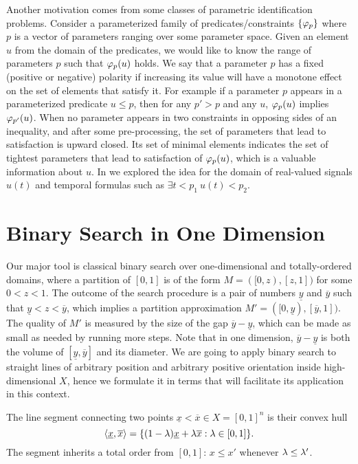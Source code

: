 \documentclass{llncs}%
\newcommand{\ul}[1]{{\underline{#1}}}
\renewcommand{\ov}[1]{{\overline{#1}}}
\newcommand{\ux}{\ul{x}}
\newcommand{\ox}{\ov{x}}
\newcommand{\uy}{\ul{y}}
\newcommand{\oy}{\ov{y}}
\newcommand{\diag}[2]{{\langle #1,#2\rangle}}
\begin{document}
Another motivation comes from some classes of parametric identification problems. Consider a parameterized family of predicates/constraints $\{\varphi_p\}$ where $p$ is a vector of parameters ranging over some parameter space. Given an element $u$  from the domain of the predicates, we would like to know the range of parameters $p$ such that $\varphi_p(u)$ holds.  We say that a parameter $p$ has a fixed (positive or negative) polarity if increasing its value will have a monotone effect on the set of elements that satisfy it. For example if a parameter $p$ appears in a parameterized predicate $u\leq p$, then for any $p'>p$ and any $u$, $\varphi_p(u)$ implies $\varphi_{p'}(u)$. When no parameter appears in two constraints in opposing sides of an inequality, and after some pre-processing, the set of parameters that lead to satisfaction is upward closed. Its set of minimal elements indicates the set of tightest parameters that lead to satisfaction of $\varphi_p(u)$, which is a valuable information about $u$. In \cite{parametric} we explored the idea for the domain of real-valued signals $u(t)$ and temporal formulas such as $\exists t<p_1 ~ u(t)<p_2$.

\section{Binary Search in One Dimension}

Our major tool is  classical binary search over one-dimensional and totally-ordered domains, where a partition of $[0,1]$ is of the form $M=([0,z),[z,1])$ for some $0<z<1$. The outcome of the search procedure is a pair of numbers $\uy$ and $\oy$ such that $\uy<z<\oy$, which implies a partition approximation $M'=([0,\uy),[\oy,1])$. The quality of $M'$ is measured by the size of the gap $\oy-\uy$, which can be made as small as needed by running more steps. Note that in one dimension, $\oy-\uy$ is both the volume of $[\uy,\oy]$ and its diameter. We are going to apply binary search to straight lines of arbitrary position and arbitrary positive orientation inside high-dimensional $X$, hence we formulate it in terms that will facilitate its application in this context.


\begin{definition}
The line segment connecting two points  $\ux<\ox\in X =[0,1]^n$ is their
convex hull
$$\diag{\ux}{\ox}=\{(1-\l)\ux+\l \ox:\l \in [0,1]\}.$$
The segment inherits a total order from $[0,1]$: $x\leq x'$ whenever $\lambda\leq \lambda'$.
\end{definition}
\end{document}
